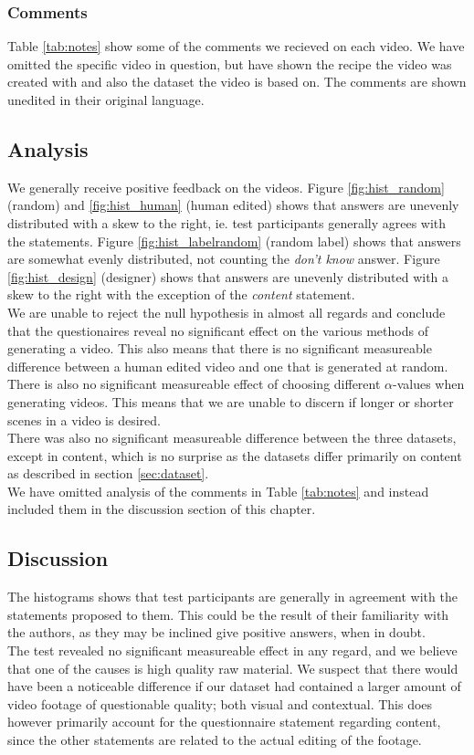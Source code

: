 \subsubsection{Comments}\label{sec:comments}
%
Table \ref{tab:notes} show some of the comments we recieved on each video. We have omitted the specific video in question, but have shown the recipe the video was created with and also the dataset the video is based on. The comments are shown unedited in their original language.
%

%
\subsection{Analysis}
%
We generally receive positive feedback on the videos. Figure \ref{fig:hist_random} (random) and \ref{fig:hist_human} (human edited) shows that answers are unevenly distributed with a skew to the right, ie. test participants generally agrees with the statements. Figure \ref{fig:hist_labelrandom} (random label) shows that answers are somewhat evenly distributed, not counting the \textit{don't know} answer. Figure \ref{fig:hist_design} (designer) shows that answers are unevenly distributed with a skew to the right with the exception of the \textit{content} statement.\\
We are unable to reject the null hypothesis in almost all regards and conclude that the questionaires reveal no significant effect on the various methods of generating a video. This also means that there is no significant measureable difference between a human edited video and one that is generated at random.\\
%
There is also no significant measureable effect of choosing different $\alpha$-values when generating videos. This means that we are unable to discern if longer or shorter scenes in a video is desired.\\
%
There was also no significant measureable difference between the three datasets, except in content, which is no surprise as the datasets differ primarily on content as described in section \ref{sec:dataset}.\\
%
We have omitted analysis of the comments in Table \ref{tab:notes} and instead included them in the discussion section of this chapter.
%
\subsection{Discussion}
%
The histograms shows that test participants are generally in agreement with the statements proposed to them. This could be the result of their familiarity with the authors, as they may be inclined give positive answers, when in doubt.\\
The test revealed no significant measureable effect in any regard, and we believe that one of the causes is high quality raw material. We suspect that there would have been a noticeable difference if our dataset had contained a larger amount of video footage of questionable quality; both visual and contextual. This does however primarily account for the questionnaire statement regarding content, since the other statements are related to the actual editing of the footage.
%

